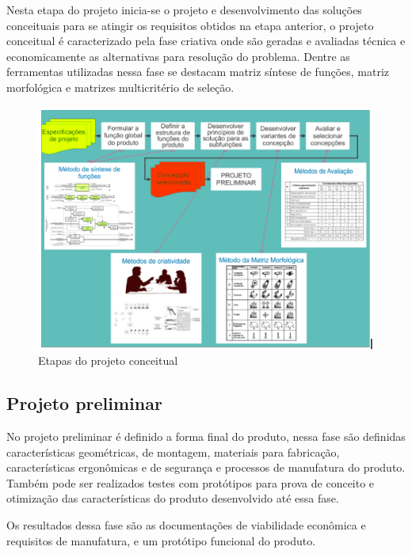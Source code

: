 Nesta etapa do projeto inicia-se o projeto e desenvolvimento das soluções conceituais para se atingir os requisitos obtidos na etapa anterior, o projeto conceitual é
caracterizado pela fase criativa onde são geradas e avaliadas técnica e economicamente as alternativas para resolução do problema. Dentre as ferramentas utilizadas nessa
fase se destacam matriz síntese de funções, matriz morfológica e matrizes multicritério de seleção. \autocite{PRODIP}

\begin{figure}[htb]
	\caption{\label{fig:1190}Etapas do projeto conceitual}
	\begin{center}
		\includegraphics[width=\textwidth]{pictures/1190.png}
	\end{center}
\end{figure}

\subsection{Projeto preliminar}

No projeto preliminar é definido a forma final do produto, nessa fase são definidas características geométricas, de montagem, materiais para fabricação, características
ergonômicas e de segurança e processos de manufatura do produto. Também pode ser realizados testes com protótipos para prova de conceito e otimização das características
do produto desenvolvido até essa fase. \autocite{Back2008}

Os resultados dessa fase são as documentações de viabilidade econômica e requisitos de manufatura, e um protótipo funcional do produto.

